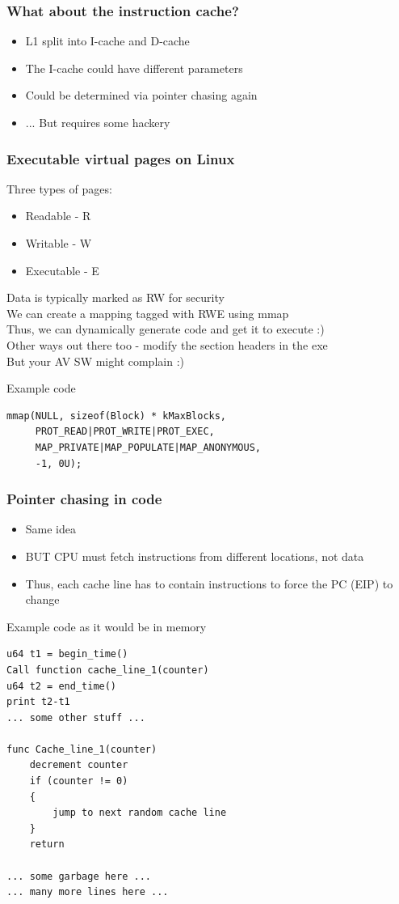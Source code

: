 \documentclass{beamer}
\begin{document}
\begin{frame}
\frametitle{What about the instruction cache?}
\begin{itemize}
\item L1 split into I-cache and D-cache 
\item The I-cache could have different parameters
\item Could be determined via pointer chasing again
\item ... But requires some hackery
\end{itemize}
\end{frame}

\begin{frame}[fragile]
\frametitle{Executable virtual pages on Linux}
Three types of pages:\\
\begin{itemize}
\item Readable - R
\item Writable - W
\item Executable - E
\end{itemize}
Data is typically marked as RW for security\\
We can create a mapping tagged with RWE using mmap\\
Thus, we can dynamically generate code and get it to execute :)\\
Other ways out there too - modify the section headers in the exe\\
But your AV SW might complain :)

\begin{block}{Example code}
\begin{lstlisting}[style=code]
mmap(NULL, sizeof(Block) * kMaxBlocks,
     PROT_READ|PROT_WRITE|PROT_EXEC,
     MAP_PRIVATE|MAP_POPULATE|MAP_ANONYMOUS,
     -1, 0U);
\end{lstlisting}
\end{block}
\end{frame}

\begin{frame}[fragile]
\frametitle{Pointer chasing in code}
\begin{itemize}
\item Same idea
\item BUT CPU must fetch instructions from different locations, not data
\item Thus, each cache line has to contain instructions to force the PC (EIP) to change
\end{itemize}
\begin{block}{Example code as it would be in memory}
\begin{lstlisting}[style=code]
u64 t1 = begin_time()
Call function cache_line_1(counter)
u64 t2 = end_time()
print t2-t1
... some other stuff ...

func Cache_line_1(counter)
    decrement counter
    if (counter != 0)
    {
        jump to next random cache line
    }
    return

... some garbage here ...
... many more lines here ...
\end{lstlisting}
\end{block}
\end{frame}
\end{document}

